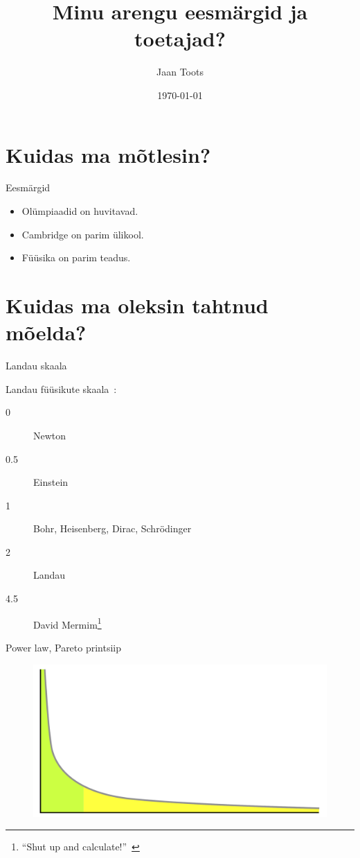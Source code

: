 \documentclass{beamer}
\title{Minu arengu eesmärgid ja toetajad?}
\author{Jaan Toots}
\date{\today}
\begin{document}
\maketitle

\section{Kuidas ma mõtlesin?}

\begin{frame}{Eesmärgid}

  \begin{itemize}
  \item Olümpiaadid on huvitavad.
    \pause{}
  \item Cambridge on parim ülikool.
    \pause{}
  \item Füüsika on parim teadus.
  \end{itemize}

\end{frame}

\section{Kuidas ma oleksin tahtnud mõelda?}

\begin{frame}{Landau skaala}

  Landau füüsikute skaala~\cite{hey1997einstein}:
  \begin{description}
  \item[0] Newton
  \item[0.5] Einstein
  \item[1] Bohr, Heisenberg, Dirac, Schrödinger
  \item[2] Landau
  \item[4.5] David Mermim\footnote{``Shut up and
      calculate!''~\cite{mermin2004could}}
  \end{description}

\end{frame}

\begin{frame}{Power law, Pareto printsiip}

  \begin{figure}[h]
    \centering
    \includegraphics[width=\textwidth]{long_tail.pdf}
  \end{figure}

\end{frame}
\end{document}
